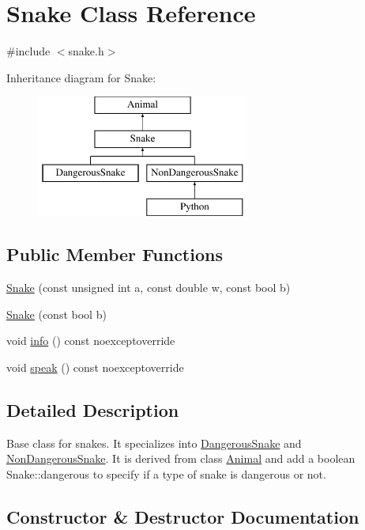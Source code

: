 \hypertarget{classSnake}{}\section{Snake Class Reference}
\label{classSnake}


{\ttfamily \#include $<$snake.\+h$>$}

Inheritance diagram for Snake\+:\begin{figure}[H]
\begin{center}
\leavevmode
\includegraphics[height=4.000000cm]{classSnake}
\end{center}
\end{figure}
\subsection*{Public Member Functions}
\begin{DoxyCompactItemize}
\item 
\hyperlink{classSnake_a57f45c42d54f744517283ed5411f01d7}{Snake} (const unsigned int a, const double w, const bool b)
\item 
\hyperlink{classSnake_a3155ff2573c745c17c8b8ca8b90b5926}{Snake} (const bool b)
\item 
void \hyperlink{classSnake_a274887b6614bede92d3343c740f24206}{info} () const noexceptoverride
\item 
void \hyperlink{classSnake_a70ce47696989febece8de5280fa28aa7}{speak} () const noexceptoverride
\end{DoxyCompactItemize}


\subsection{Detailed Description}
Base class for snakes. It specializes into \hyperlink{classDangerousSnake}{Dangerous\+Snake} and \hyperlink{classNonDangerousSnake}{Non\+Dangerous\+Snake}. It is derived from class \hyperlink{classAnimal}{Animal} and add a boolean Snake\+::dangerous to specify if a type of snake is dangerous or not. 

\subsection{Constructor \& Destructor Documentation}
